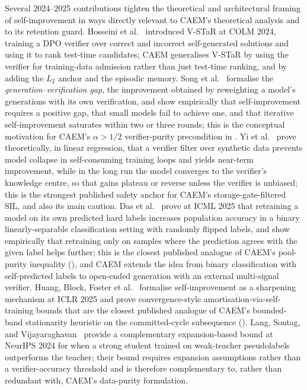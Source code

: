 Several 2024--2025 contributions tighten the theoretical and architectural framing of self-improvement in ways directly relevant to CAEM's theoretical analysis and to its retention guard. Hosseini et al.~\cite{hosseini2024vstar} introduced V-STaR at COLM 2024, training a DPO verifier over correct and incorrect self-generated solutions and using it to rank test-time candidates; CAEM generalises V-STaR by using the verifier for training-data admission rather than just test-time ranking, and by adding the $L_{2}$ anchor and the episodic memory. Song et al.~\cite{song2024gap} formalise the \emph{generation--verification gap}, the improvement obtained by reweighting a model's generations with its own verification, and show empirically that self-improvement requires a positive gap, that small models fail to achieve one, and that iterative self-improvement saturates within two or three rounds; this is the conceptual motivation for CAEM's $\alpha > 1/2$ verifier-purity precondition in . Yi et al.~\cite{fu2025collapse} prove theoretically, in linear regression, that a verifier filter over synthetic data prevents model collapse in self-consuming training loops and yields near-term improvement, while in the long run the model converges to the verifier's knowledge centre, so that gains plateau or reverse unless the verifier is unbiased; this is the strongest published safety anchor for CAEM's storage-gate-filtered SIL, and also its main caution. Das et al.~\cite{das2025retraining} prove at ICML 2025 that retraining a model on its own predicted hard labels increases population accuracy in a binary linearly-separable classification setting with randomly flipped labels, and show empirically that retraining only on samples where the prediction agrees with the given label helps further; this is the closest published analogue of CAEM's pool-purity inequality (), and CAEM extends the idea from binary classification with self-predicted labels to open-ended generation with an external multi-signal verifier. Huang, Block, Foster et al.~\cite{huang2025sharpening} formalise self-improvement as a sharpening mechanism at ICLR 2025 and prove convergence-style amortisation-via-self-training bounds that are the closest published analogue of CAEM's bounded-band stationarity heuristic on the committed-cycle subsequence (). Lang, Sontag, and Vijayaraghavan~\cite{lang2024w2s} provide a complementary expansion-based bound at NeurIPS 2024 for when a strong student trained on weak-teacher pseudolabels outperforms the teacher; their bound requires expansion assumptions rather than a verifier-accuracy threshold and is therefore complementary to, rather than redundant with, CAEM's data-purity formulation.

